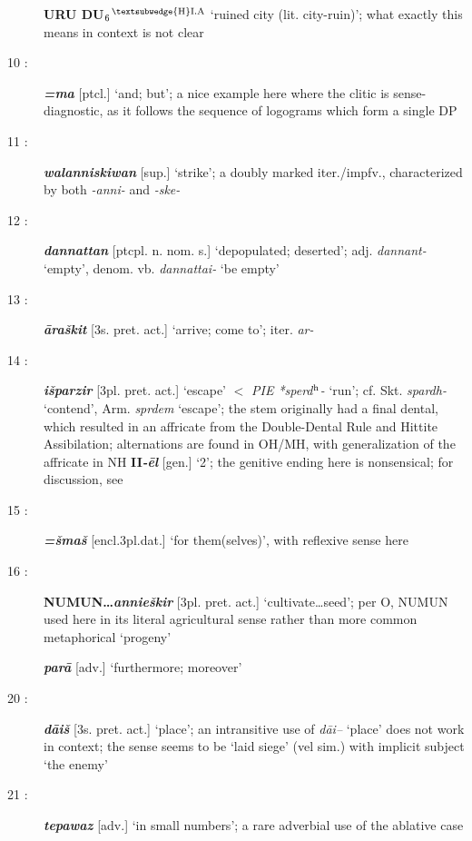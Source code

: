 \documentclass[10pt]{article}
\newcommand{\supersc}[1]{$^{\textrm{\scriptsize{#1}}}$}  	%
\newcommand{\subsc}[1]{$_{\textrm{\scriptsize{#1}}}$}	%
\newcommand{\bit}[1]{\textbf{\textit{#1}}}				%
\newcommand{\p}[1]{{\tiny[{#1}]}}					%
\renewcommand{\dh}{d\supersc{h}}							%
\newcommand{\hith}{\textsubwedge{h}}
\newcommand{\Hith}{\textsubwedge{H}}
\newcommand{\hpl}{\supersc{{\Hith}I.A}}
\renewcommand{\.}[1]{\textsubdot{#1}}
\begin{document}
\begin{description}
\textbf{URU DU\subsc{6}\hpl} `ruined city (lit. city-ruin)'; what exactly this means in context is not clear

\item[10 :] \bit{=ma} \p{ptcl.} `and; but'; a nice example here where the clitic is sense-diagnostic, as it follows the sequence of logograms which form a single DP

\item[11 :] \bit{wal{\hith}anniskiwan} \p{sup.} `strike'; a doubly marked iter./impfv., characterized by both \textit{-anni-} and \textit{-ske-}

\item[12 :] \bit{dannattan} \p{ptcpl. n. nom. s.} `depopulated; deserted'; adj. \textit{dannant-} `empty', denom. vb. \textit{dannattai-} `be empty' 

\item[13 :] \bit{\=ara\v{s}kit} \p{3s. pret. act.} `arrive; come to'; iter. \textit{ar-}

\item[14 :] \bit{i\v{s}parzir} \p{3pl. pret. act.} `escape' $<$ \textit{PIE *sper{\dh}-} `run'; cf. Skt. \textit{spardh-} `contend', Arm. \textit{sprdem} `escape'; the stem originally had a final dental, which resulted in an affricate from the {\sc Double-Dental Rule} and {\sc Hittite Assibilation}; alternations are found in OH/MH, with generalization of the affricate in NH {\bf II}\bit{-\=el} \p{gen.} `2'; the genitive ending here is nonsensical; for discussion, see \citet{eichner1992numerals}

\item[15 :] \bit{=\v{s}ma\v{s}} \p{encl.3pl.dat.} `for them(selves)', with reflexive sense here

\item[16 :] \textbf{NUMUN\ldots}\bit{annie\v{s}kir} \p{3pl. pret. act.} `cultivate{\ldots}seed'; per O, NUMUN used here in its literal agricultural sense rather than more common metaphorical `progeny' 

\bit{par\=a} \p{adv.} `furthermore; moreover'

\item[20 :] \bit{d\=ai\v{s}} \p{3s. pret. act.} `place'; an intransitive use of \textit{d\=ai--} `place' does not work in context; the sense seems to be `laid siege' (vel sim.) with implicit subject `the enemy'

\item[21 :] \bit{tepawaz} \p{adv.} `in small numbers'; a rare adverbial use of the ablative case \citep[cf.][]{melchert1977diss}


\end{description}
\end{document}
